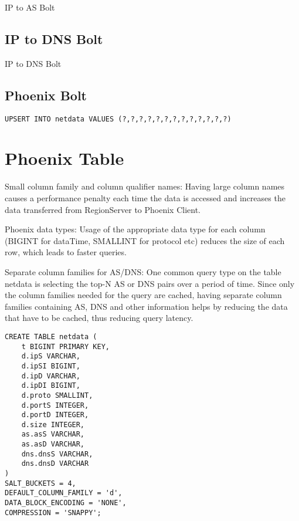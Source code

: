 \begin{algorithm}[H]
\begin{algorithmic}[1]
\EndFunction
{}
\EndFunction
{}
\EndFunction
\end{algorithmic}
\caption{IP to AS Bolt}
\label{algorithm:ip_to_as_bolt}
\end{algorithm}

\subsection{IP to DNS Bolt}

\begin{algorithm}[H]
\begin{algorithmic}[1]
\EndFunction
{}
\EndFunction
\end{algorithmic}
\caption{IP to DNS Bolt}
\label{algorithm:ip_to_dns_bolt}
\end{algorithm}

\subsection{Phoenix Bolt}

\begin{lstlisting}[language=PhoenixSQL]
UPSERT INTO netdata VALUES (?,?,?,?,?,?,?,?,?,?,?,?,?)
\end{lstlisting}

\section{Phoenix Table}

Small column family and column qualifier names: Having large column names causes a performance penalty each time the data is accessed and increases the data transferred from RegionServer to Phoenix Client.

Phoenix data types: Usage of the appropriate data type for each column (BIGINT for dataTime, SMALLINT for protocol etc) reduces the size of each row, which leads to faster queries.

Separate column families for AS/DNS: One common query type on the table netdata is selecting the top-N AS or DNS pairs over a period of time. Since only the column families needed for the query are cached, having separate column families containing AS, DNS and other information helps by reducing the data that have to be cached, thus reducing query latency.

\begin{lstlisting}[language=PhoenixSQL]
CREATE TABLE netdata (
    t BIGINT PRIMARY KEY,
    d.ipS VARCHAR,
    d.ipSI BIGINT,
    d.ipD VARCHAR,
    d.ipDI BIGINT,
    d.proto SMALLINT,
    d.portS INTEGER,
    d.portD INTEGER,
    d.size INTEGER,
    as.asS VARCHAR,
    as.asD VARCHAR,
    dns.dnsS VARCHAR,
    dns.dnsD VARCHAR
) 
SALT_BUCKETS = 4,
DEFAULT_COLUMN_FAMILY = 'd',
DATA_BLOCK_ENCODING = 'NONE',
COMPRESSION = 'SNAPPY';
\end{lstlisting}


\cleardoublepage
